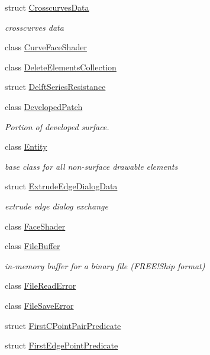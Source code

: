 \begin{DoxyCompactItemize}
\item 
struct \hyperlink{structShipCAD_1_1CrosscurvesData}{Crosscurves\+Data}
\begin{DoxyCompactList}\small\item\em crosscurves data \end{DoxyCompactList}\item 
class \hyperlink{classShipCAD_1_1CurveFaceShader}{Curve\+Face\+Shader}
\item 
class \hyperlink{classShipCAD_1_1DeleteElementsCollection}{Delete\+Elements\+Collection}
\item 
struct \hyperlink{structShipCAD_1_1DelftSeriesResistance}{Delft\+Series\+Resistance}
\item 
class \hyperlink{classShipCAD_1_1DevelopedPatch}{Developed\+Patch}
\begin{DoxyCompactList}\small\item\em Portion of developed surface. \end{DoxyCompactList}\item 
class \hyperlink{classShipCAD_1_1Entity}{Entity}
\begin{DoxyCompactList}\small\item\em base class for all non-\/surface drawable elements \end{DoxyCompactList}\item 
struct \hyperlink{structShipCAD_1_1ExtrudeEdgeDialogData}{Extrude\+Edge\+Dialog\+Data}
\begin{DoxyCompactList}\small\item\em extrude edge dialog exchange \end{DoxyCompactList}\item 
class \hyperlink{classShipCAD_1_1FaceShader}{Face\+Shader}
\item 
class \hyperlink{classShipCAD_1_1FileBuffer}{File\+Buffer}
\begin{DoxyCompactList}\small\item\em in-\/memory buffer for a binary file (F\+R\+E\+E!\+Ship format) \end{DoxyCompactList}\item 
class \hyperlink{classShipCAD_1_1FileReadError}{File\+Read\+Error}
\item 
class \hyperlink{classShipCAD_1_1FileSaveError}{File\+Save\+Error}
\item 
struct \hyperlink{structShipCAD_1_1FirstCPointPairPredicate}{First\+C\+Point\+Pair\+Predicate}
\item 
struct \hyperlink{structShipCAD_1_1FirstEdgePointPredicate}{First\+Edge\+Point\+Predicate}

\end{DoxyCompactItemize}
